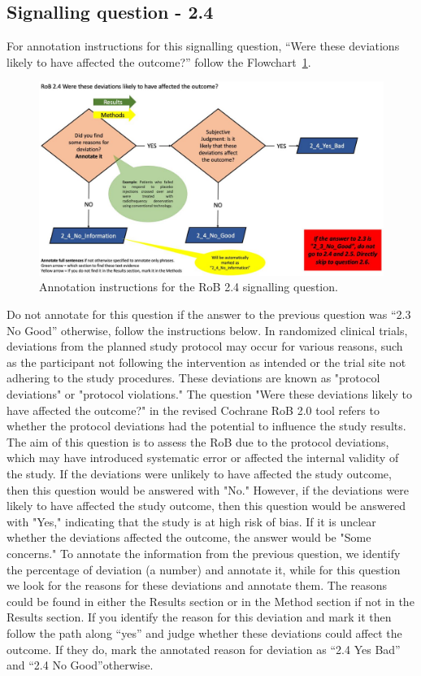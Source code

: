 \documentclass[sn-mathphys,Numbered]{sn-jnl}%
\begin{document}
\subsection*{Signalling question - 2.4 }
%
For annotation instructions for this signalling question, ``Were these deviations likely to have affected the outcome?'' follow the Flowchart~\ref{fig:2_4}.
%
\begin{figure}[hbt]
    \centering
    \includegraphics[width=\textwidth]{figures/2_4.jpg}
    \caption{Annotation instructions for the RoB 2.4 signalling question.}
    \label{fig:2_4}
\end{figure}
%
Do not annotate for this question if the answer to the previous question was ``2.3 No Good'' otherwise, follow the instructions below.
In randomized clinical trials, deviations from the planned study protocol may occur for various reasons, such as the participant not following the intervention as intended or the trial site not adhering to the study procedures.
These deviations are known as "protocol deviations" or "protocol violations."
The question "Were these deviations likely to have affected the outcome?" in the revised Cochrane RoB 2.0 tool refers to whether the protocol deviations had the potential to influence the study results.
The aim of this question is to assess the RoB due to the protocol deviations, which may have introduced systematic error or affected the internal validity of the study.
If the deviations were unlikely to have affected the study outcome, then this question would be answered with "No."
However, if the deviations were likely to have affected the study outcome, then this question would be answered with "Yes," indicating that the study is at high risk of bias.
If it is unclear whether the deviations affected the outcome, the answer would be "Some concerns."
To annotate the information from the previous question, we identify the percentage of deviation (a number) and annotate it, while for this question we look for the reasons for these deviations and annotate them.
The reasons could be found in either the Results section or in the Method section if not in the Results section.
If you identify the reason for this deviation and mark it then follow the path along ``yes'' and judge whether these deviations could affect the outcome.
If they do, mark the annotated reason for deviation as ``2.4 Yes Bad'' and ``2.4 No Good''otherwise.
%
%
%
\end{document}
